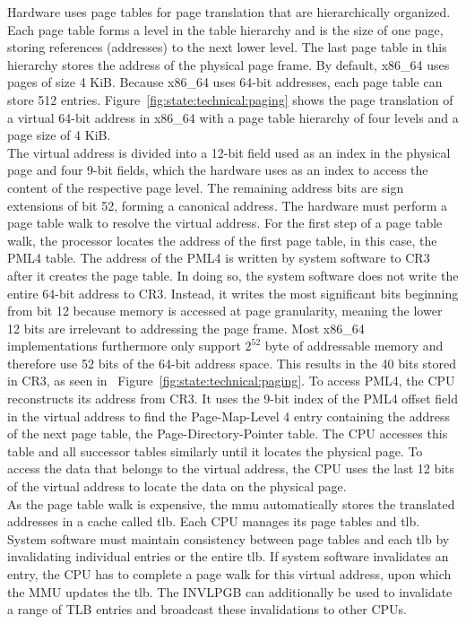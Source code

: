Hardware uses page tables for page translation that are hierarchically
organized. Each page table forms a level in the table hierarchy and is the size
of one page, storing references (addresses) to the next lower level. The last
page table in this hierarchy stores the address of the physical page frame. By
default, x86\_64 uses pages of size 4 KiB. Because x86\_64 uses 64-bit
addresses, each page table can store 512 entries.
Figure~\ref{fig:state:technical:paging} shows the page translation of a virtual
64-bit address in x86\_64 with a page table hierarchy of four levels and a page
size of 4 KiB. \\

The virtual address is divided into a 12-bit field used as an index in the
physical page and four 9-bit fields, which the hardware uses as an index to
access the content of the respective page level. The remaining address bits are
sign extensions of bit 52, forming a canonical address. The hardware must
perform a page table walk to resolve the virtual address. For the first step of
a page table walk, the processor locates the address of the first page table, in
this case, the PML4 table. The address of the PML4 is written by system software
to CR3 after it creates the page table. In doing so, the system software does
not write the entire 64-bit address to CR3. Instead, it writes the most
significant bits beginning from bit 12 because memory is accessed at page
granularity, meaning the lower 12 bits are irrelevant to addressing the page
frame. Most x86\_64 implementations furthermore only support $2^{52}$ byte of
addressable memory and therefore use 52 bits of the 64-bit address space. This
results in the 40 bits stored in CR3, as seen in
~Figure~\ref{fig:state:technical:paging}. To access PML4, the CPU reconstructs
its address from CR3. It uses the 9-bit index of the PML4 offset field in the
virtual address to find the Page-Map-Level 4 entry containing the address of the
next page table, the Page-Directory-Pointer table. The CPU accesses this table
and all successor tables similarly until it locates the physical page. To access
the data that belongs to the virtual address, the CPU uses the last 12 bits of
the virtual address to locate the data on the physical page. \\

As the page table walk is expensive, the \gls{mmu} automatically stores
the translated addresses in a cache called \gls{tlb}.
Each CPU manages its page tables and \gls{tlb}. System software must
maintain consistency between page tables and each \gls{tlb} by
invalidating individual entries or the entire \gls{tlb}. If system
software invalidates an entry, the CPU has to complete a page walk for this
virtual address, upon which the MMU updates the \gls{tlb}. The INVLPGB
can additionally be used to invalidate a range of TLB entries and broadcast
these invalidations to other CPUs. \\

